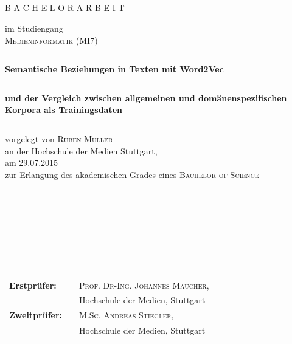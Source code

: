 \documentclass[12pt,a4paper]{report}
\begin{document}
\thispagestyle{empty}
\begin{verbatim}





\end{verbatim}

\begin{center}
\large B A C H E L O R A R B E I T


\end{center}
\begin{center}
im Studiengang\\
\textsc{Medieninformatik (MI7)}\\

\begin{verbatim}
\end{verbatim}

\textbf{\huge{Semantische Beziehungen in Texten mit Word2Vec }}\\
\begin{verbatim}
\end{verbatim}
\textbf{\large{und der Vergleich zwischen allgemeinen und domänenspezifischen Korpora als Trainingsdaten}}\\

\begin{verbatim}
\end{verbatim}
vorgelegt von \textsc{Ruben Müller}\\

an der Hochschule der Medien Stuttgart,\\

am 29.07.2015\\

zur Erlangung des akademischen Grades eines \textsc{Bachelor of Science}


\begin{verbatim}
\end{verbatim}


\end{center}
\begin{verbatim}







\end{verbatim}

\begin{flushleft}
\begin{tabular}{lll}
\textbf{Erstprüfer:} & & \textsc{Prof. Dr-Ing. Johannes Maucher},\\ 
&&\small Hochschule der Medien, Stuttgart  \\
\textbf{Zweitprüfer:} & & \textsc{M.Sc. Andreas Stiegler},\\
&&\small Hochschule der Medien, Stuttgart\\
\end{tabular}
\end{flushleft}
\newpage
\end{document}
